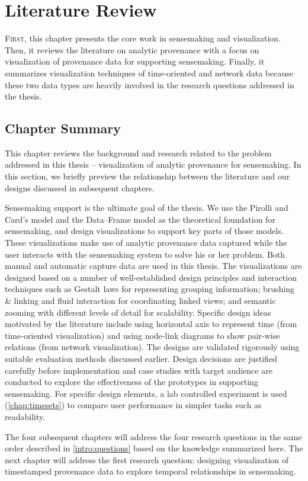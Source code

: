 \chapter{Literature Review}
\label{chap:review}

\graphicspath{{Chapter2/figures/}}

\lettrine{F}{irst}, this chapter presents the core work in sensemaking and visualization. Then, it reviews the literature on analytic provenance with a focus on visualization of provenance data for supporting sensemaking. Finally, it summarizes visualization techniques of time-oriented and network data because these two data types are heavily involved in the research questions addressed in the thesis.


%
%
%

\section{Chapter Summary}
This chapter reviews the background and research related to the problem addressed in this thesis – visualization of analytic provenance for sensemaking. In this section, we briefly preview the relationship between the literature and our designs discussed in subsequent chapters.

Sensemaking support is the ultimate goal of the thesis. We use the Pirolli and Card’s model and the Data–Frame model as the theoretical foundation for sensemaking, and design visualizations to support key parts of those models. These visualizations make use of analytic provenance data captured while the user interacts with the sensemaking system to solve his or her problem. Both manual and automatic capture data are used in this thesis. The visualizations are designed based on a number of well-established design principles and interaction techniques such as Gestalt laws for representing grouping information; brushing \& linking and fluid interaction for coordinating linked views; and semantic zooming with different levels of detail for scalability. Specific design ideas motivated by the literature include using horizontal axis to represent time (from time-oriented visualization) and using node-link diagrams to show pair-wise relations (from network visualization). The designs are validated rigorously using suitable evaluation methods discussed earlier. Design decisions are justified carefully before implementation and case studies with target audience are conducted to explore the effectiveness of the prototypes in supporting sensemaking. For specific design elements, a lab controlled experiment is used (\autoref{chap:timesets}) to compare user performance in simpler tasks such as readability.

The four subsequent chapters will address the four research questions in the same order described in \autoref{intro:questions} based on the knowledge summarized here. The next chapter will address the first research question: designing visualization of timestamped provenance data to explore temporal relationships in sensemaking.